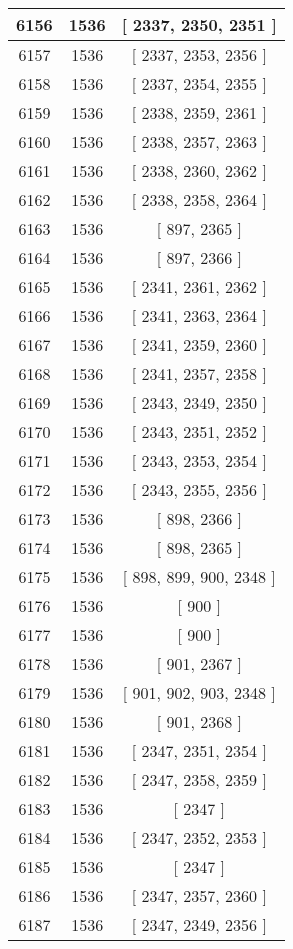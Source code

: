 \begin{center}
\begin{longtable}[H]{|| c c c ||}
\hline
6156 & 1536 & [ 2337, 2350, 2351 ] \\ 
\hline
6157 & 1536 & [ 2337, 2353, 2356 ] \\ 
\hline
6158 & 1536 & [ 2337, 2354, 2355 ] \\ 
\hline
6159 & 1536 & [ 2338, 2359, 2361 ] \\ 
\hline
6160 & 1536 & [ 2338, 2357, 2363 ] \\ 
\hline
6161 & 1536 & [ 2338, 2360, 2362 ] \\ 
\hline
6162 & 1536 & [ 2338, 2358, 2364 ] \\ 
\hline
6163 & 1536 & [ 897, 2365 ] \\ 
\hline
6164 & 1536 & [ 897, 2366 ] \\ 
\hline
6165 & 1536 & [ 2341, 2361, 2362 ] \\ 
\hline
6166 & 1536 & [ 2341, 2363, 2364 ] \\ 
\hline
6167 & 1536 & [ 2341, 2359, 2360 ] \\ 
\hline
6168 & 1536 & [ 2341, 2357, 2358 ] \\ 
\hline
6169 & 1536 & [ 2343, 2349, 2350 ] \\ 
\hline
6170 & 1536 & [ 2343, 2351, 2352 ] \\ 
\hline
6171 & 1536 & [ 2343, 2353, 2354 ] \\ 
\hline
6172 & 1536 & [ 2343, 2355, 2356 ] \\ 
\hline
6173 & 1536 & [ 898, 2366 ] \\ 
\hline
6174 & 1536 & [ 898, 2365 ] \\ 
\hline
6175 & 1536 & [ 898, 899, 900, 2348 ] \\ 
\hline
6176 & 1536 & [ 900 ] \\ 
\hline
6177 & 1536 & [ 900 ] \\ 
\hline
6178 & 1536 & [ 901, 2367 ] \\ 
\hline
6179 & 1536 & [ 901, 902, 903, 2348 ] \\ 
\hline
6180 & 1536 & [ 901, 2368 ] \\ 
\hline
6181 & 1536 & [ 2347, 2351, 2354 ] \\ 
\hline
6182 & 1536 & [ 2347, 2358, 2359 ] \\ 
\hline
6183 & 1536 & [ 2347 ] \\ 
\hline
6184 & 1536 & [ 2347, 2352, 2353 ] \\ 
\hline
6185 & 1536 & [ 2347 ] \\ 
\hline
6186 & 1536 & [ 2347, 2357, 2360 ] \\ 
\hline
6187 & 1536 & [ 2347, 2349, 2356 ] \\ 

\end{longtable}
\end{center}
